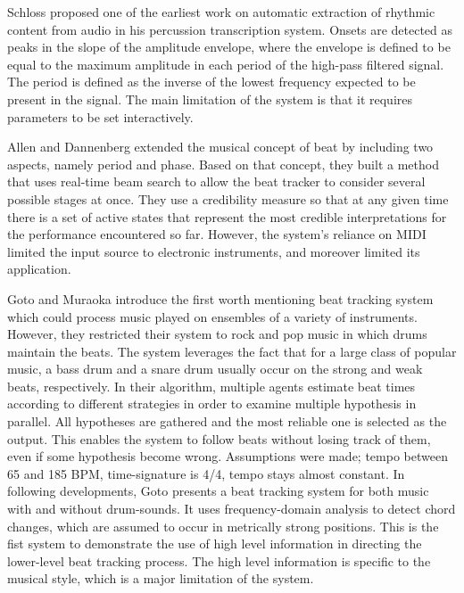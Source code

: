\documentclass{scrartcl}
\begin{document}
Schloss \cite{Schloss1985} proposed one of the earliest work on automatic extraction of rhythmic content from audio in his percussion transcription system. Onsets are detected as peaks in the slope of the amplitude envelope, where the envelope is defined to be equal to the maximum amplitude in each period of the high-pass filtered signal. The period is defined as the inverse of the lowest frequency expected to be present in the signal. The main limitation of the system is that it requires parameters to be set interactively. 

Allen and Dannenberg \cite{Allen1990} extended the musical concept of beat by including two aspects, namely period and phase. Based on that concept, they built a method that uses real-time beam search to allow the beat tracker to consider several possible stages at once. They use a credibility measure so that at any given time there is a set of active states that represent the most credible interpretations for the performance encountered so far. However, the system's reliance on MIDI limited the input source to electronic instruments, and moreover limited its application.

Goto and Muraoka \cite{Goto1994} introduce the first worth mentioning beat tracking system which could process music played on ensembles of a variety of instruments. However, they restricted their system to rock and pop music in which drums maintain the beats. The system leverages the fact that for a large class of popular music, a bass drum and a snare drum usually occur on the strong and weak beats, respectively. In their algorithm, multiple agents estimate beat times according to different strategies in order to examine multiple hypothesis in parallel. All hypotheses are gathered and the most reliable one is selected as the output. This enables the system to follow beats without losing track of them, even if some hypothesis become wrong. Assumptions were made; tempo between 65 and 185 BPM, time-signature is 4/4, tempo stays almost constant. In following developments, Goto \cite{Goto2001} presents a beat tracking system for both music with and without drum-sounds. It uses frequency-domain analysis to detect chord changes, which are assumed to occur in metrically strong positions. This is the fist system to demonstrate the use of high level information in directing the lower-level beat tracking process. The high level information is specific to the musical style, which is a major limitation of the system.  
\end{document}
